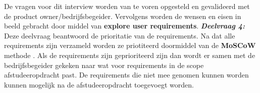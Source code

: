 De vragen voor dit interview worden van te voren opgesteld en gevalideerd met de product owner/bedrijfsbegeider.
Vervolgens worden de wensen en eisen in beeld gebracht door middel van \textbf{explore user requirements}.
\whitespace
\textit{\textbf{Deelvraag 4:} \SubquestionFour} \\
Deze deelvraag beantwoord de prioritatie van de requirements.
Na dat alle requirements zijn verzameld worden ze priotiteerd doormiddel van de \textbf{MoSCoW} methode  \Parencite{MoSCoW}. 
Als de requirements zijn geprioriteerd zijn dan wordt er samen met de bedrijfsbegeider gekeken naar wat voor requirements in de scope afstudeeropdracht past.
De requirements die niet mee genomen kunnen worden kunnen mogelijk na de afstudeeropdracht toegevoegt worden.
